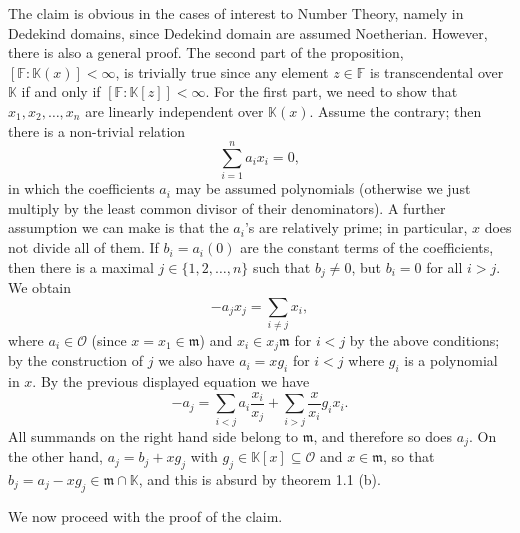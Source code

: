\documentclass[11pt]{article}
\makeatletter
\theoremstyle{scplain}
\renewenvironment{proof}[1][\proofname]{%
  \par\pushQED{\qed}\normalfont\topsep6\p@\@plus6\p@\relax
  \trivlist\item[\hskip\labelsep\scshape #1\@addpunct{.}]\ignorespaces}%
  {\popQED\endtrivlist\@endpefalse}
\makeatother
\begin{document}
\begin{proof}
The claim is obvious in the cases of interest to Number Theory, namely in
Dedekind domains, since Dedekind domain are assumed Noetherian. However, there is
also a general proof. The second part of the proposition,
$[\mathbb{F} : \mathbb{K}(x)] < \infty$, is trivially true since any element
$z \in \mathbb{F}$ is transcendental over $\mathbb{K}$ if and only if
$[\mathbb{F} : \mathbb{K}[z]] < \infty$. For the first part, we need to show that
$x_1, x_2, \ldots, x_n$ are linearly independent over $\mathbb{K}(x)$. Assume the
contrary; then there is a non-trivial relation
\[
  \sum_{i=1}^{n} a_i x_i = 0,
\]
in which the coefficients $a_i$ may be assumed polynomials (otherwise we just
multiply by the least common divisor of their denominators). A further assumption
we can make is that the $a_i$'s are relatively prime; in particular, $x$ does not
divide all of them. If $b_i = a_i(0)$ are the constant terms of the coefficients,
then there is a maximal $j \in \{1, 2, \ldots, n\}$ such that $b_j \neq 0$, but
$b_i = 0$ for all $i > j$. We obtain
\[
  -a_j x_j = \sum_{i \neq j} x_i,
\]
where $a_i \in \mathcal{O}$ (since $x = x_1 \in \mathfrak{m}$) and
$x_i \in x_j \mathfrak{m}$ for $i < j$ by the above conditions; by the
construction of $j$ we also have $a_i = x g_i$ for $i < j$ where $g_i$ is a
polynomial in $x$. By the previous displayed equation we have
\[
  -a_j = \sum_{i<j} a_i \frac{x_i}{x_j} + \sum_{i>j} \frac{x}{x_i} g_i x_i.
\]
All summands on the right hand side belong to $\mathfrak{m}$, and therefore so
does $a_j$. On the other hand, $a_j = b_j + x g_j$ with
$g_j \in \mathbb{K}[x] \subseteq \mathcal{O}$ and $x \in \mathfrak{m}$, so that
$b_j = a_j - x g_j \in \mathfrak{m} \cap \mathbb{K}$, and this is absurd by
theorem 1.1 (b).
\end{proof}

We now proceed with the proof of the claim.
\end{document}
